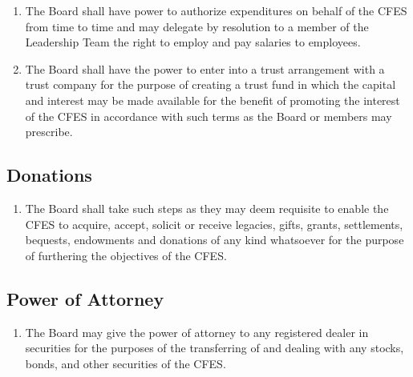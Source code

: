 \begin{enumerate}
 \item The Board shall have power to authorize expenditures on behalf of the CFES from time to time and may delegate by resolution to a member of the Leadership Team the right to employ and pay salaries to employees.
 \item The Board shall have the power to enter into a trust arrangement with a trust company for the purpose of creating a trust fund in which the capital and interest may be made available for the benefit of promoting the interest of the CFES in accordance with such terms as the Board or members may prescribe.
\end{enumerate}

\subsection{Donations}
\label{financial-and-legal-dispositions-donations}

\begin{enumerate}
 \item The Board shall take such steps as they may deem requisite to enable the CFES to acquire, accept, solicit or receive legacies, gifts, grants, settlements, bequests, endowments and donations of any kind whatsoever for the purpose of furthering the objectives of the CFES.
\end{enumerate}

\subsection{Power of Attorney}
\label{financial-and-legal-dispositions-power-of-attorney}

\begin{enumerate}
 \item The Board may give the power of attorney to any registered dealer in securities for the purposes of the transferring of and dealing with any stocks, bonds, and other securities of the CFES.
\end{enumerate}
